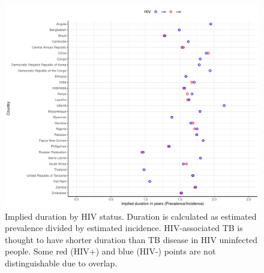 \documentclass[12pt]{article}
\begin{document}
\begin{figure}
  \centering
  \includegraphics[width=1\textwidth]{../plots/aF7.pdf}
  \caption[Implied duration by HIV status]{Implied duration by HIV status.
    Duration is calculated as estimated prevalence divided by estimated
    incidence. HIV-associated TB is thought to have shorter duration than TB
    disease in HIV uninfected people. Some red (HIV+) and blue (HIV-) points are not
    distinguishable due to overlap.}
\end{figure}


\FloatBarrier
\end{document}
